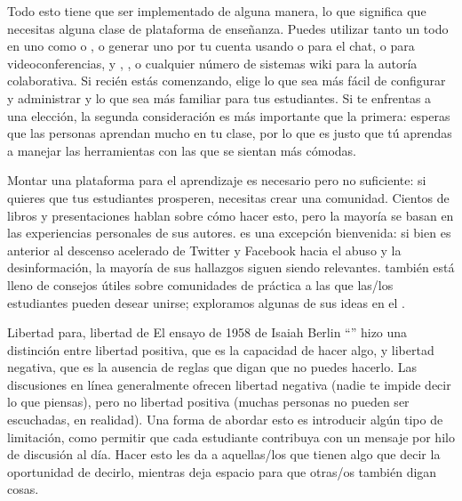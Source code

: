 Todo esto tiene que ser implementado de alguna manera,
lo que significa que necesitas alguna clase de plataforma de enseñanza.
Puedes utilizar tanto un  todo en uno
como  o ,
o generar uno por tu cuenta
usando  o  para el chat,
o  para videoconferencias,
y ,
,
o cualquier número de sistemas wiki para la autoría colaborativa.
Si recién estás comenzando,
elige lo que sea más fácil de configurar y administrar
y lo que sea más familiar para tus estudiantes.
Si te enfrentas a una elección,
la segunda consideración es más importante que la primera:
esperas que las personas aprendan mucho en tu clase,
por lo que es justo que tú aprendas a manejar las herramientas con las que se sientan más cómodas.

Montar una plataforma para el aprendizaje es necesario pero no suficiente:
si quieres que tus estudiantes prosperen,
necesitas crear una comunidad.
Cientos de libros y presentaciones hablan sobre cómo hacer esto,
pero la mayoría se basan en las experiencias personales de sus autores.
\cite{Krau2016} es una excepción bienvenida:
si bien es anterior al descenso acelerado de Twitter y Facebook hacia el abuso y la desinformación,
la mayoría de sus hallazgos siguen siendo relevantes.
\cite{Foge2005} también está lleno de consejos útiles
sobre comunidades de práctica a las que las/los estudiantes pueden desear unirse;
exploramos algunas de sus ideas en el .

\begin{aside}{Libertad para, libertad de}
  El ensayo de 1958 de Isaiah Berlin
  ``''
  hizo una distinción entre libertad positiva,
  que es la capacidad de hacer algo,
  y libertad negativa,
  que es la ausencia de reglas que digan que no puedes hacerlo.
  Las discusiones en línea generalmente ofrecen libertad negativa
  (nadie te impide decir lo que piensas),
  pero no libertad positiva
  (muchas personas no pueden ser escuchadas, en realidad).
  Una forma de abordar esto es introducir algún tipo de limitación,
  como permitir que cada estudiante contribuya con un mensaje por hilo de discusión al día.
  Hacer esto les da a aquellas/los que tienen algo que decir la oportunidad de decirlo,
  mientras deja espacio para que otras/os también digan cosas.
\end{aside}

